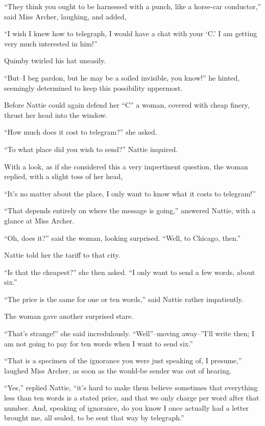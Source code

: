 ``They think you ought to be harnessed with a punch, like a horse-car
conductor,'' said Miss Archer, laughing, and added,

``I wish I knew how to telegraph, I would have a chat with your `C.' I am
getting very much interested in him!''

Quimby twirled his hat uneasily.

``But--I beg pardon, but he may be a soiled invisible, you know!'' he
hinted, seemingly determined to keep this possibility uppermost.

Before Nattie could again defend her ``C'' a woman, covered with cheap
finery, thrust her head into the window.

``How much does it cost to telegram?'' she asked.

``To what place did you wish to send?'' Nattie inquired.

With a look, as if she considered this a very impertinent question, the
woman replied, with a slight toss of her head,

``It's no matter about the place, I only want to know what it costs to
telegram!''

``That depends entirely on where the message is going,'' answered Nattie,
with a glance at Miss Archer.

``Oh, does it?'' said the woman, looking surprised. ``Well, to Chicago,
then.''

Nattie told her the tariff to that city.

``Is that the cheapest?'' she then asked. ``I only want to send a few
words, about six.''

``The price is the same for one or ten words,'' said Nattie rather
impatiently.

The woman gave another surprised stare.

``That's strange!'' she said incredulously. ``Well''--moving away--''I'll
write then; I am not going to pay for ten words when I want to send
six.''

``That is a specimen of the ignorance you were just speaking of, I
presume,'' laughed Miss Archer, as soon as the would-be sender was out of
hearing.

``Yes,'' replied Nattie, ``it's hard to make them believe sometimes that
everything less than ten words is a stated price, and that we only
charge per word after that number. And, speaking of ignorance, do you
know I once actually had a letter brought me, all sealed, to be sent
that way by telegraph.''

